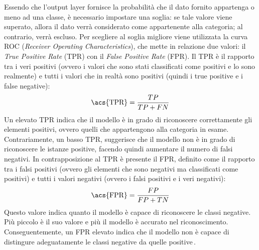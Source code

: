 Essendo che l'output layer fornisce la probabilità che il dato fornito appartenga o meno ad una classe, è necessario impostare una soglia: se tale valore viene superato, allora il dato verrà considerato come appartenente alla categoria; al contrario, verrà escluso. Per scegliere al soglia migliore viene utilizzata la curva \acs{ROC} (\textit{Receiver Operating Characteristics}), che mette in relazione due valori: il \textit{True Positive Rate} (\acs{TPR}) con il \textit{False Positive Rate} (\acs{FPR}). Il \acs{TPR} è il rapporto tra i veri positivi (ovvero i valori che sono stati classificati come positivi e lo sono realmente) e tutti i valori che in realtà sono positivi (quindi i true positive e i false negative):
% 
\begin{gather*}
    \text{\acs{TPR}} = \frac{TP}{TP + FN}
\end{gather*}
% 
\noindent Un elevato \acs{TPR} indica che il modello è in grado di riconoscere correttamente gli elementi positivi, ovvero quelli che appartengono alla categoria in esame. Contrariamente, un basso \acs{TPR}, suggerisce che il modello non è in grado di riconoscere le istanze positive, facendo quindi aumentare il numero di falsi negativi. In contrapposizione al \acs{TPR} è presente il \acs{FPR}, definito come il rapporto tra i falsi positivi (ovvero gli elementi che sono negativi ma classificati come positivi) e tutti i valori negativi (ovvero i falsi positivi e i veri negativi):
% 
\begin{gather*}
    \text{\acs{FPR}} = \frac{FP}{FP + TN}
\end{gather*}
% 
\noindent Questo valore indica quanto il modello è capace di riconoscere le classi negative. Più piccolo è il suo valore e più il modello è accurato nel riconoscimento. Conseguentemente, un \acs{FPR} elevato indica che il modello non è capace di distingure adeguatamente le classi negative da quelle positive\,\cite{narkhede2018understanding}.

